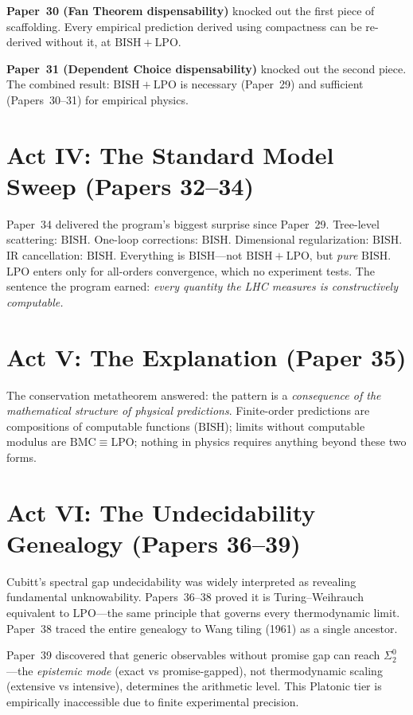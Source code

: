 \documentclass[11pt,a4paper]{report}
\theoremstyle{plain}
\theoremstyle{definition}
\theoremstyle{remark}
\newcommand{\BISH}{\mathrm{BISH}}
\newcommand{\LPO}{\mathrm{LPO}}
\newcommand{\BMC}{\mathrm{BMC}}
\begin{document}
\textbf{Paper~30 (Fan Theorem dispensability)} knocked out the first piece of scaffolding. Every empirical prediction derived using compactness can be re-derived without it, at $\BISH+\LPO$.

\textbf{Paper~31 (Dependent Choice dispensability)} knocked out the second piece. The combined result: $\BISH+\LPO$ is necessary (Paper~29) and sufficient (Papers~30--31) for empirical physics.

\section*{Act IV: The Standard Model Sweep (Papers 32--34)}

Paper~34 delivered the program's biggest surprise since Paper~29. Tree-level scattering: $\BISH$. One-loop corrections: $\BISH$. Dimensional regularization: $\BISH$. IR cancellation: $\BISH$. Everything is $\BISH$---not $\BISH+\LPO$, but \emph{pure} $\BISH$. $\LPO$ enters only for all-orders convergence, which no experiment tests. The sentence the program earned: \emph{every quantity the LHC measures is constructively computable.}

\section*{Act V: The Explanation (Paper 35)}

The conservation metatheorem answered: the pattern is a \emph{consequence of the mathematical structure of physical predictions}. Finite-order predictions are compositions of computable functions ($\BISH$); limits without computable modulus are $\BMC \equiv \LPO$; nothing in physics requires anything beyond these two forms.

\section*{Act VI: The Undecidability Genealogy (Papers 36--39)}

Cubitt's spectral gap undecidability was widely interpreted as revealing fundamental unknowability. Papers~36--38 proved it is Turing--Weihrauch equivalent to $\LPO$---the same principle that governs every thermodynamic limit. Paper~38 traced the entire genealogy to Wang tiling (1961) as a single ancestor.

Paper~39 discovered that generic observables without promise gap can reach $\Sigma^0_2$---the \emph{epistemic mode} (exact vs promise-gapped), not thermodynamic scaling (extensive vs intensive), determines the arithmetic level. This Platonic tier is empirically inaccessible due to finite experimental precision.
\end{document}
